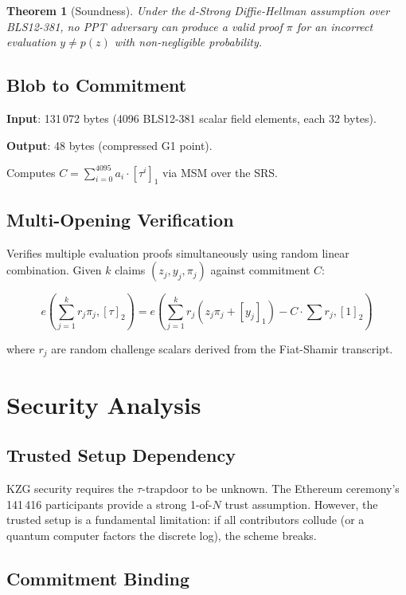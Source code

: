 \documentclass[11pt,a4paper]{article}
\newtheorem{theorem}{Theorem}
\begin{document}
\begin{theorem}[Soundness]
Under the $d$-Strong Diffie-Hellman assumption over BLS12-381, no PPT adversary
can produce a valid proof $\pi$ for an incorrect evaluation $y \neq p(z)$ with
non-negligible probability.
\end{theorem}

\subsection{Blob to Commitment}

\textbf{Input}: 131\,072 bytes (4096 BLS12-381 scalar field elements, each 32 bytes).

\textbf{Output}: 48 bytes (compressed G1 point).

Computes $C = \sum_{i=0}^{4095} a_i \cdot [\tau^i]_1$ via MSM over the SRS.

\subsection{Multi-Opening Verification}

Verifies multiple evaluation proofs simultaneously using random linear combination.
Given $k$ claims $(z_j, y_j, \pi_j)$ against commitment $C$:

\[
  e\!\left(\sum_{j=1}^{k} r_j \pi_j, [\tau]_2\right) =
  e\!\left(\sum_{j=1}^{k} r_j (z_j \pi_j + [y_j]_1) - C \cdot \sum r_j, [1]_2\right)
\]

where $r_j$ are random challenge scalars derived from the Fiat-Shamir transcript.

\section{Security Analysis}

\subsection{Trusted Setup Dependency}

KZG security requires the $\tau$-trapdoor to be unknown. The Ethereum ceremony's
141\,416 participants provide a strong 1-of-$N$ trust assumption. However, the
trusted setup is a fundamental limitation: if all contributors collude (or a
quantum computer factors the discrete log), the scheme breaks.

\subsection{Commitment Binding}
\end{document}
